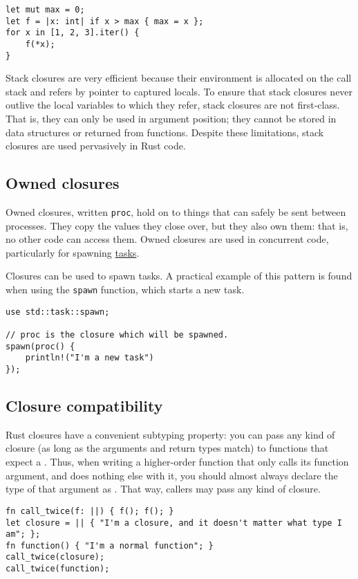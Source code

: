 \documentclass[]{article}
\begin{document}
\begin{verbatim}
let mut max = 0;
let f = |x: int| if x > max { max = x };
for x in [1, 2, 3].iter() {
    f(*x);
}
\end{verbatim}

Stack closures are very efficient because their environment is allocated
on the call stack and refers by pointer to captured locals. To ensure
that stack closures never outlive the local variables to which they
refer, stack closures are not first-class. That is, they can only be
used in argument position; they cannot be stored in data structures or
returned from functions. Despite these limitations, stack closures are
used pervasively in Rust code.

\subsection{Owned closures}\label{owned-closures}

Owned closures, written \texttt{proc}, hold on to things that can safely
be sent between processes. They copy the values they close over, but
they also own them: that is, no other code can access them. Owned
closures are used in concurrent code, particularly for spawning
\href{guide-tasks.html}{tasks}.

Closures can be used to spawn tasks. A practical example of this pattern
is found when using the \texttt{spawn} function, which starts a new
task.

\begin{verbatim}
use std::task::spawn;

// proc is the closure which will be spawned.
spawn(proc() {
    println!("I'm a new task")
});
\end{verbatim}

\subsection{Closure compatibility}\label{closure-compatibility}

Rust closures have a convenient subtyping property: you can pass any
kind of closure (as long as the arguments and return types match) to
functions that expect a \texttt{\textbar{}\textbar{}}. Thus, when
writing a higher-order function that only calls its function argument,
and does nothing else with it, you should almost always declare the type
of that argument as \texttt{\textbar{}\textbar{}}. That way, callers may
pass any kind of closure.

\begin{verbatim}
fn call_twice(f: ||) { f(); f(); }
let closure = || { "I'm a closure, and it doesn't matter what type I am"; };
fn function() { "I'm a normal function"; }
call_twice(closure);
call_twice(function);
\end{verbatim}
\end{document}
